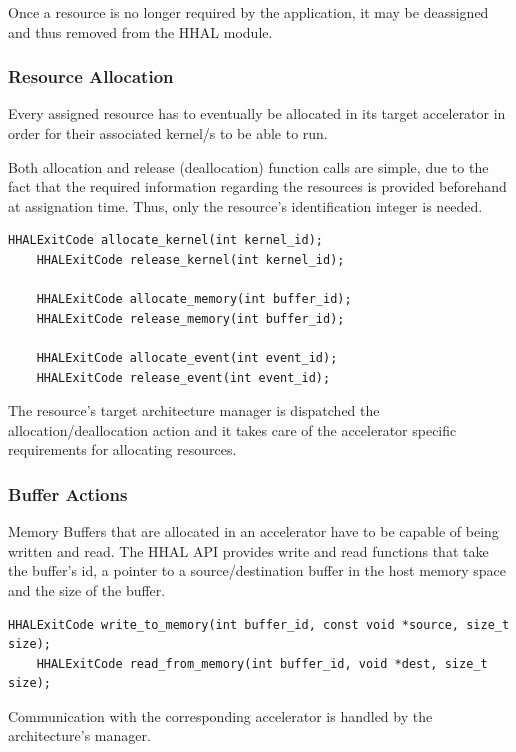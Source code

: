 Once a resource is no longer required by the application, it may be deassigned and thus removed from the HHAL module.

\subsubsection{Resource Allocation}

Every assigned resource has to eventually be allocated in its target accelerator in order for their associated kernel/s to be able to run.

Both allocation and release (deallocation) function calls are simple, due to the fact that the required information regarding the resources is provided beforehand at assignation time. Thus, only the resource's identification integer is needed.

\begin{lstlisting}[style=CStyle, caption=HHAL API - Allocation functions]
    HHALExitCode allocate_kernel(int kernel_id);
    HHALExitCode release_kernel(int kernel_id);

    HHALExitCode allocate_memory(int buffer_id);
    HHALExitCode release_memory(int buffer_id);

    HHALExitCode allocate_event(int event_id);
    HHALExitCode release_event(int event_id);
\end{lstlisting}

The resource's target architecture manager is dispatched the allocation/deallocation action and it takes care of the accelerator specific requirements for allocating resources.

\subsubsection{Buffer Actions}

Memory Buffers that are allocated in an accelerator have to be capable of being written and read. The HHAL API provides write and read functions that take the buffer's id, a pointer to a source/destination buffer in the host memory space and the size of the buffer.

\begin{lstlisting}[style=CStyle, caption=HHAL API - Buffer actions]
    HHALExitCode write_to_memory(int buffer_id, const void *source, size_t size);
    HHALExitCode read_from_memory(int buffer_id, void *dest, size_t size);
\end{lstlisting}

Communication with the corresponding accelerator is handled by the architecture's manager.

